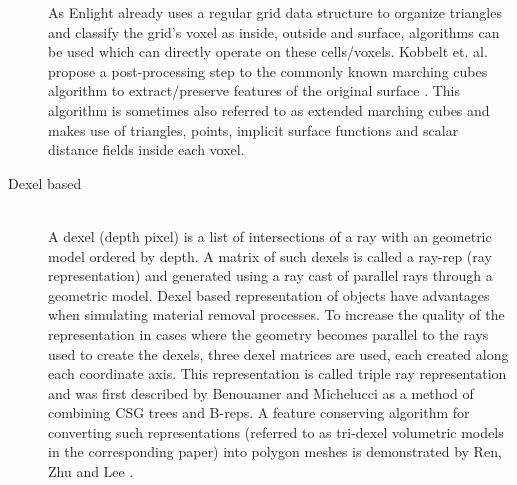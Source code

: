\begin{description}
As Enlight already uses a regular grid data structure to organize triangles and classify the grid's voxel as inside, outside and surface, algorithms can be used which can directly operate on these cells/voxels.
Kobbelt et. al. propose a post-processing step to the commonly known marching cubes algorithm to extract/preserve features of the original surface \cite{extended_marching_cubes}. This algorithm is sometimes also referred to as extended marching cubes and makes use of triangles, points, implicit surface functions and scalar distance fields inside each voxel.


\item[Dexel based] \hfill \\

A dexel (depth pixel) is a list of intersections of a ray with an geometric model ordered by depth. A matrix of such dexels is called a ray-rep (ray representation) and generated using a ray cast of parallel rays through a geometric model. Dexel based representation of objects have advantages when simulating material removal processes. To increase the quality of the representation in cases where the geometry becomes parallel to the rays used to create the dexels, three dexel matrices are used, each created along each coordinate axis. This representation is called triple ray representation and was first described by Benouamer and Michelucci \cite{tridexel_intersection} as a method of combining CSG trees and B-reps. A feature conserving algorithm for converting such representations (referred to as tri-dexel volumetric models in the corresponding paper) into polygon meshes is demonstrated by Ren, Zhu and Lee \cite{tridexel_reconstruction}.

\end{description}
